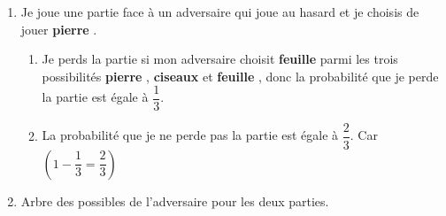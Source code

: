
\begin{enumerate}
\item Je joue une partie face à  un adversaire qui joue au hasard et je choisis de jouer \og \textbf{pierre} \fg{}. 
	\begin{enumerate}
		\item Je perds la partie si mon adversaire choisit \og \textbf{feuille} \fg{} parmi les trois \linebreak possibilités \og \textbf{pierre} \fg{}, \og \textbf{ciseaux} \fg{} et \og \textbf{feuille} \fg{}, donc la probabilité que je perde la partie est égale à $\dfrac13$.
		\item La probabilité que je ne perde pas la partie est égale à $\dfrac23$. \quad Car $\left( 1-\dfrac13=\dfrac23\right)$
	\end{enumerate}
\item  Arbre des possibles de l'adversaire pour les deux parties. 

\makeatletter
 

\end{enumerate}
